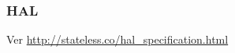 \subsubsection{HAL}
\label{soa:tecnologias:hal}


Ver \url{http://stateless.co/hal_specification.html}
